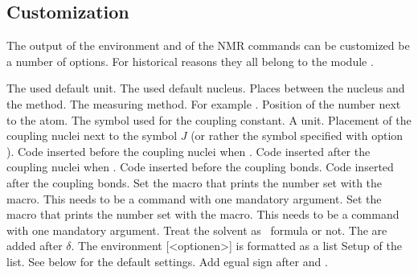 \documentclass[load-preamble+]{cnltx-doc}
\begin{document}
\subsection{Customization}\label{sec:experimental-customization}

The output of the environment and of the NMR commands can be customized be a
number of options.  For historical reasons they all belong to the module
.
\begin{options}
    The used default unit.
    The used default nucleus.
  \Default{-}
    Places  between the nucleus and the method.
    The measuring method.
  \Default
    For example .
    Position of the number next to the atom.
    The symbol used for the coupling constant.
    A  unit.
    Placement of the coupling nuclei next to the symbol
    $J$ (or rather the symbol specified with option
    ).
  \Default{(}
    Code inserted before the coupling nuclei when
    .
  \Default{)}
    Code inserted after the coupling nuclei when
    .
  \Default
    Code inserted before the coupling bonds.
  \Default{\cs*{!}}
    Code inserted after the coupling bonds.
    Set the macro that prints the number set with the
     macro.  This needs to be a command with one mandatory argument.
    Set the macro that prints the number set with the
    \cs{\#} macro.  This needs to be a command with one mandatory argument.
    Treat the solvent as \chemformula\ formula or not.
  \Default
    The  are added after $\delta$.
    The environment [<optionen>]{} is formatted as a list
    Setup of the list. See below for the default settings.
    Add egual sign after  and .
\end{options}
\end{document}
